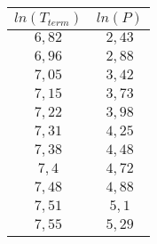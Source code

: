 \begin{tabular}{| c | c |}
\hline
$ln(T_{term})$ & $ln(P)$\\
\hline
$6,82$ & $2,43$\\
\hline
$6,96$ & $2,88$\\
\hline
$7,05$ & $3,42$\\
\hline
$7,15$ & $3,73$\\
\hline
$7,22$ & $3,98$\\
\hline
$7,31$ & $4,25$\\
\hline
$7,38$ & $4,48$\\
\hline
$7,4$ & $4,72$\\
\hline
$7,48$ & $4,88$\\
\hline
$7,51$ & $5,1$\\
\hline
$7,55$ & $5,29$\\
\hline
\end{tabular}
